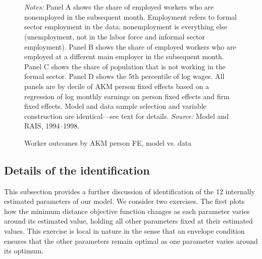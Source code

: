 \begin{figure}[!htb]
  \centering
  \caption{Worker outcomes by AKM person FE, model vs. data\label{figure: model fit 2}}
  \prefigvspace
  \\
  \\
  \postfigvspace
  \begin{minipage}[t]{1\columnwidth}%
    \begin{spacing}{0.75}
      \emph{\scriptsize{}Notes: }{\scriptsize{}Panel A shows the share of employed workers who are nonemployed in the subsequent month. Employment refers to formal sector employment in the data; nonemployment is everything else (unemployment, not in the labor force and informal sector employment). Panel B shows the share of employed workers who are employed at a different main employer in the subsequent month. Panel C shows the share of population that is not working in the formal sector. Panel D shows the 5th percentile of log wages. All panels are by decile of AKM person fixed effects based on a regression of log monthly earnings on person fixed effects and firm fixed effects. Model and data sample selection and variable construction are identical---see text for details. %
      \emph{\scriptsize{}Source: } Model and RAIS, 1994--1998.}
    \end{spacing}
  \end{minipage}
\end{figure}




\clearpage
\subsection{Details of the identification\label{app_subsec:identification}}

This subsection provides a further discussion of identification of the 12 internally estimated parameters of our model. We consider two exercises. The first plots how the minimum distance objective function changes as each parameter varies around its estimated value, holding all other parameters fixed at their estimated values. This exercise is local in nature in the sense that an envelope condition ensures that the other parameters remain optimal as one parameter varies around its optimum.

